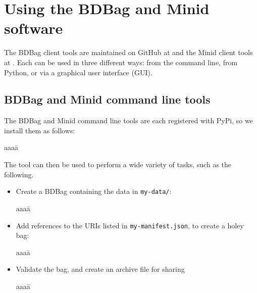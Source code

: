 \documentclass[11pt]{article}
\begin{document}
\section{Using the BDBag and Minid software}

The BDBag client tools are maintained on GitHub at  and the 
Minid client tools at .
Each can be used in three different ways: from the command line, from Python, or via a graphical user interface (GUI).

\subsection{BDBag and Minid command line tools} 

The BDBag and Minid command line tools are each registered with PyPi, 
so we install them as follows:
\vspace{-1ex}
\begin{tabbing}
aaaa\=\kill
\>\\
\>
\end{tabbing}

\noindent
The  tool can then be used to perform a wide variety of tasks, such as the following.
\begin{itemize}
\vspace{-1ex}

\item
Create a BDBag containing the data in \texttt{my-data/}:
\vspace{-2ex}
\begin{tabbing}
aaaa\=\kill
\>
\end{tabbing}

\vspace{-2ex}

\item
Add references to the URIs listed in \texttt{my-manifest.json}, to create a holey bag:
\vspace{-2ex}
\begin{tabbing}
aaaa\=\kill
\>
\end{tabbing}

\vspace{-2ex}

\item
Validate the bag, and create an archive file for sharing
\vspace{-2ex}
\begin{tabbing}
aaaa\=\kill
\>
\end{tabbing}

\vspace{-2ex}

\end{itemize}
\end{document}
